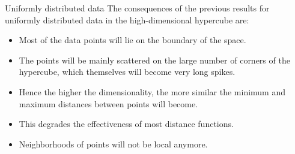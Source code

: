\begin{vbframe}{Uniformly distributed data}
The consequences of the previous results for uniformly distributed data in the high-dimensional hypercube are:

\medskip

\begin{itemize}
\item Most of the data points will lie on the boundary of the space.
\item The points will be mainly scattered on the large number of corners of the hypercube, which themselves will become very long spikes.
\item Hence the higher the dimensionality, the more similar the minimum and maximum distances between points will become.
\item This degrades the effectiveness of most distance functions.
\item Neighborhoods of points will not be local anymore.
\end{itemize}

\end{vbframe}

